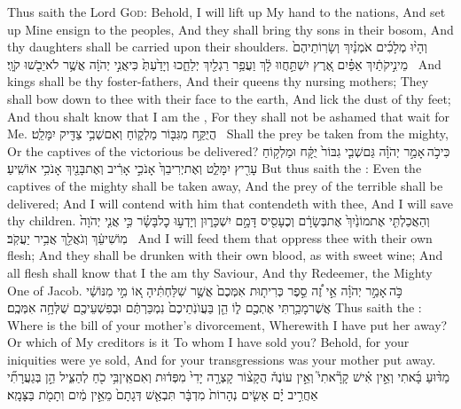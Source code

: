 {Thus saith the Lord \textsc{God}: Behold, I will lift up My hand to the nations, And set up Mine ensign to the peoples, And they shall bring thy sons in their bosom, And thy daughters shall be carried upon their shoulders.}
{וְהָי֨וּ מְלָכִ֜ים אֹמְנַ֗יִךְ וְשָׂרֽוֹתֵיהֶם֙ מֵינִ֣יקֹתַ֔יִךְ אַפַּ֗יִם אֶ֚רֶץ יִשְׁתַּ֣חֲווּ לָ֔ךְ וַעֲפַ֥ר רַגְלַ֖יִךְ יְלַחֵ֑כוּ וְיָדַ֙עַתְּ֙ כִּי\maqqaf אֲנִ֣י יְהֹוָ֔ה אֲשֶׁ֥ר לֹא\maqqaf יֵבֹ֖שׁוּ קֹוָֽי׃ \setuma }
{And kings shall be thy foster-fathers, And their queens thy nursing mothers; They shall bow down to thee with their face to the earth, And lick the dust of thy feet; And thou shalt know that I am the \lord, For they shall not be ashamed that wait for Me.}
{הֲיֻקַּ֥ח מִגִּבּ֖וֹר מַלְק֑וֹחַ וְאִם\maqqaf שְׁבִ֥י צַדִּ֖יק יִמָּלֵֽט׃ \setuma }
{Shall the prey be taken from the mighty, Or the captives of the victorious be delivered?}
{כִּי\maqqaf כֹ֣ה \legarmeh  אָמַ֣ר יְהֹוָ֗ה גַּם\maqqaf שְׁבִ֤י גִבּוֹר֙ יֻקָּ֔ח וּמַלְק֥וֹחַ עָרִ֖יץ יִמָּלֵ֑ט וְאֶת\maqqaf יְרִיבֵךְ֙ אָנֹכִ֣י אָרִ֔יב וְאֶת\maqqaf בָּנַ֖יִךְ אָנֹכִ֥י אוֹשִֽׁיעַ׃}
{But thus saith the \lord: Even the captives of the mighty shall be taken away, And the prey of the terrible shall be delivered; And I will contend with him that contendeth with thee, And I will save thy children.}
{וְהַאֲכַלְתִּ֤י אֶת\maqqaf מוֹנַ֙יִךְ֙ אֶת\maqqaf בְּשָׂרָ֔ם וְכֶעָסִ֖יס דָּמָ֣ם יִשְׁכָּר֑וּן וְיָדְע֣וּ כׇל\maqqaf בָּשָׂ֗ר כִּ֣י אֲנִ֤י יְהֹוָה֙ מֽוֹשִׁיעֵ֔ךְ וְגֹאֲלֵ֖ךְ אֲבִ֥יר יַעֲקֹֽב׃ \setuma }
{And I will feed them that oppress thee with their own flesh; And they shall be drunken with their own blood, as with sweet wine; And all flesh shall know that I the \lord\space am thy Saviour, And thy Redeemer, the Mighty One of Jacob.}
\newperek
{}
{כֹּ֣ה \legarmeh  אָמַ֣ר יְהֹוָ֗ה אֵ֣י זֶ֠ה סֵ֣פֶר כְּרִית֤וּת אִמְּכֶם֙ אֲשֶׁ֣ר שִׁלַּחְתִּ֔יהָ א֚וֹ מִ֣י מִנּוֹשַׁ֔י אֲשֶׁר\maqqaf מָכַ֥רְתִּי אֶתְכֶ֖ם ל֑וֹ הֵ֤ן בַּעֲוֺנֹֽתֵיכֶם֙ נִמְכַּרְתֶּ֔ם וּבְפִשְׁעֵיכֶ֖ם שֻׁלְּחָ֥ה אִמְּכֶֽם׃}
{Thus saith the \lord: Where is the bill of your mother’s divorcement, Wherewith I have put her away? Or which of My creditors is it To whom I have sold you? Behold, for your iniquities were ye sold, And for your transgressions was your mother put away.}
{מַדּ֨וּעַ בָּ֜אתִי וְאֵ֣ין אִ֗ישׁ קָרָ֘אתִי֮ וְאֵ֣ין עוֹנֶה֒ הֲקָצ֨וֹר קָצְרָ֤ה יָדִי֙ מִפְּד֔וּת וְאִם\maqqaf אֵֽין\maqqaf בִּ֥י כֹ֖חַ לְהַצִּ֑יל הֵ֣ן בְּגַעֲרָתִ֞י אַחֲרִ֣יב יָ֗ם אָשִׂ֤ים נְהָרוֹת֙ מִדְבָּ֔ר תִּבְאַ֤שׁ דְּגָתָם֙ מֵאֵ֣ין מַ֔יִם וְתָמֹ֖ת בַּצָּמָֽא׃}
